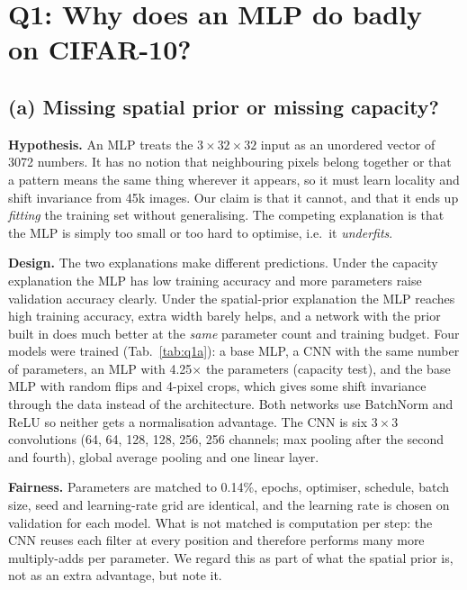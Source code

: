 \section{Q1: Why does an MLP do badly on CIFAR-10?}
\label{sec:q1}

\subsection{(a) Missing spatial prior or missing capacity?}
\textbf{Hypothesis.} An MLP treats the $3\times32\times32$ input as an unordered vector of 3072 numbers. It has
no notion that neighbouring pixels belong together or that a pattern means the same thing wherever it appears,
so it must learn locality and shift invariance from 45k images. Our claim is that it cannot, and that it ends
up \emph{fitting} the training set without generalising. The competing explanation is that the MLP is simply
too small or too hard to optimise, i.e.\ it \emph{underfits}.

\textbf{Design.} The two explanations make different predictions. Under the capacity explanation the MLP has low
training accuracy and more parameters raise validation accuracy clearly. Under the spatial-prior explanation the
MLP reaches high training accuracy, extra width barely helps, and a network with the prior built in does much
better at the \emph{same} parameter count and training budget. Four models were trained
(Tab.~\ref{tab:q1a}): a base MLP, a CNN with the same number of parameters, an MLP with 4.25$\times$ the
parameters (capacity test), and the base MLP with random flips and 4-pixel crops, which gives some shift
invariance through the data instead of the architecture. Both networks use BatchNorm and ReLU so neither gets a
normalisation advantage. The CNN is six $3\times3$ convolutions (64, 64, 128, 128, 256, 256 channels; max
pooling after the second and fourth), global average pooling and one linear layer.

\textbf{Fairness.} Parameters are matched to 0.14\%, epochs, optimiser, schedule, batch size, seed and
learning-rate grid are identical, and the learning rate is chosen on validation for each model. What is not
matched is computation per step: the CNN reuses each filter at every position and therefore performs many
more multiply-adds per parameter. We regard this as part of what the spatial prior is, not as an extra
advantage, but note it.

